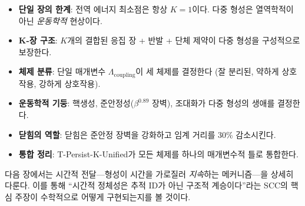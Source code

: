 \begin{itemize}
    \item \textbf{단일 장의 한계}: 전역 에너지 최소점은 항상 $K = 1$이다. 다중 형성은 열역학적이 아닌 \emph{운동학적} 현상이다.

    \item \textbf{K-장 구조}: $K$개의 결합된 응집 장 + 반발 + 단체 제약이 다중 형성을 구성적으로 보장한다.

    \item \textbf{체제 분류}: 단일 매개변수 $\Lambda_{\mathrm{coupling}}$이 세 체제를 결정한다 (잘 분리된, 약하게 상호작용, 강하게 상호작용).

    \item \textbf{운동학적 기둥}: 핵생성, 준안정성($\beta^{0.89}$ 장벽), 조대화가 다중 형성의 생애를 결정한다.

    \item \textbf{닫힘의 역할}: 닫힘은 준안정 장벽을 강화하고 임계 거리를 30\% 감소시킨다.

    \item \textbf{통합 정리}: T-Persist-K-Unified가 모든 체제를 하나의 매개변수적 틀로 통합한다.
\end{itemize}

다음 장에서는 시간적 전달---형성이 시간을 가로질러 \emph{지속}하는 메커니즘---을 상세히 다룬다. 이를 통해 ``시간적 정체성은 추적 ID가 아닌 구조적 계승이다''라는 SCC의 핵심 주장이 수학적으로 어떻게 구현되는지를 볼 것이다.
